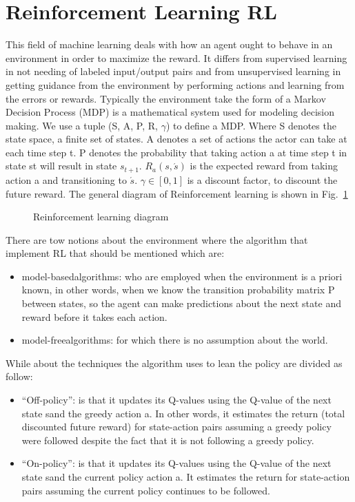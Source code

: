 \section{Reinforcement Learning RL}
This field of machine learning deals with how an agent ought to behave in an environment in order to maximize the reward. It differs from supervised learning in not needing of labeled input/output pairs and from unsupervised learning in getting guidance from the environment by performing actions and learning from the errors or rewards. Typically the environment take the form of a Markov Decision Process (MDP) is a mathematical system used for modeling decision making. We use a tuple (S, A, P, R, $\gamma$) to define a MDP. Where S denotes the state space, a finite set of states. A denotes a set of actions the actor can take at each time step t. P denotes the probability that taking action a at time step t in state st will result in state $s_{t+1}$. $R_a(s,\acute{s})$ is the expected reward from taking action a and transitioning to $\acute{s}$. $\gamma \in [0, 1]$ is a discount factor, to discount the future reward. The general diagram of Reinforcement learning is shown in Fig.~\ref{fig:RL}
\begin{figure}
	\centerline
	\RL
	\caption{Reinforcement learning diagram}
	\label{fig:RL}
\end{figure} 
\vspace{0.3cm}
There are tow notions about the environment where the algorithm that implement RL that should be mentioned which are:
\begin{itemize}
	\item \textacutedbl model-based\textacutedbl algorithms: who are employed when the environment is a priori known, in other words, when we know the transition probability matrix P between states, so the agent can make predictions about the next state and reward before it takes each action.
\end{itemize}
\begin{itemize}
	\item \textacutedbl model-free\textacutedbl algorithms: for which there is no assumption about the world.
\end{itemize}
While about the techniques the algorithm uses to lean the policy are divided as follow:
\begin{itemize}
	\item \textquotedblleft Off-policy\textquotedblright: is that it updates its Q-values using the Q-value of the next state s\textasciigrave and the greedy action a\textasciigrave. In other words, it estimates the return (total discounted future reward) for state-action pairs assuming a greedy policy were followed despite the fact that it is not following a greedy policy.
\end{itemize}
\begin{itemize}
	\item \textquotedblleft On-policy\textquotedblright: is that it updates its Q-values using the Q-value of the next state s\textasciigrave and the current policy action a. It estimates the return for state-action pairs assuming the current policy continues to be followed.
\end{itemize}

